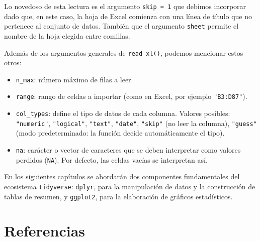 \documentclass[
  spanish,
  a4paper,
]{scrbook}
\begin{document}
Lo novedoso de esta lectura es el argumento \texttt{skip\ =\ 1} que
debimos incorporar dado que, en este caso, la hoja de Excel comienza con
una línea de título que no pertenece al conjunto de datos. También que
el argumento \texttt{sheet} permite el nombre de la hoja elegida entre
comillas.

Además de los argumentos generales de \texttt{read\_xl()}, podemos
mencionar estos otros:

\begin{itemize}
\item
  \texttt{n\_max}: número máximo de filas a leer.
\item
  \texttt{range}: rango de celdas a importar (como en Excel, por ejemplo
  \texttt{"B3:D87"}).
\item
  \texttt{col\_types}: define el tipo de datos de cada columna. Valores
  posibles: \texttt{"numeric"}, \texttt{"logical"}, \texttt{"text"},
  \texttt{"date"}, \texttt{"skip"} (no leer la columna),
  \texttt{"guess"} (modo predeterminado: la función decide
  automáticamente el tipo).
\item
  \texttt{na}: carácter o vector de caracteres que se deben interpretar
  como valores perdidos (\texttt{NA}). Por defecto, las celdas vacías se
  interpretan así.
\end{itemize}

\begin{tcolorbox}[enhanced jigsaw, arc=.35mm, bottomrule=.15mm, breakable, colback=white, colframe=quarto-callout-warning-color-frame, left=2mm, leftrule=.75mm, opacityback=0, rightrule=.15mm, toprule=.15mm]
\begin{minipage}[t]{5.5mm}
\textcolor{quarto-callout-warning-color}{\faExclamationTriangle}
\end{minipage}%
\begin{minipage}[t]{\textwidth - 5.5mm}

En los siguientes capítulos se abordarán dos componentes fundamentales
del ecosistema \texttt{tidyverse}: \texttt{dplyr}, para la manipulación
de datos y la construcción de tablas de resumen, y \texttt{ggplot2},
para la elaboración de gráficos estadísticos.

\end{minipage}%
\end{tcolorbox}

\section{Referencias}\label{referencias}
\end{document}
